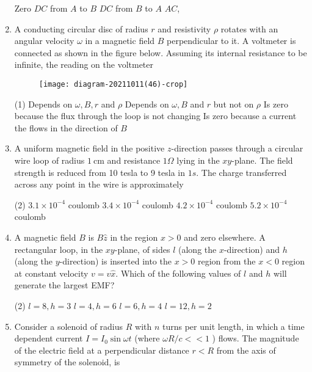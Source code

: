 \begin{enumerate}
\begin{tasks}
		\task[\textbf{A.}] Zero
		\task[\textbf{B.}] $D C$ from $A$ to $B$
		\task[\textbf{C.}] $D C$ from $B$ to $A$
		\task[\textbf{D.}] $A C$,
	\end{tasks}
	\item  A conducting circular disc of radius $r$ and resistivity $\rho$ rotates with an angular velocity $\omega$ in a magnetic field $B$ perpendicular to it. A voltmeter is connected as shown in the figure below. Assuming its internal resistance to be infinite, the reading on the voltmeter
	{}
	\begin{figure}[H]
		\centering
		\texttt{[image: diagram-20211011(46)-crop]}
	\end{figure}
	\begin{tasks}(1)
		\task[\textbf{A.}] Depends on $\omega, B, r$ and $\rho$
		\task[\textbf{B.}] Depends on $\omega, B$ and $r$ but not on $\rho$
		\task[\textbf{C.}]  Is zero because the flux through the loop is not changing
		\task[\textbf{D.}] Is zero because a current the flows in the direction of $B$
	\end{tasks}	
	\item A uniform magnetic field in the positive $z$-direction passes through a circular wire loop of radius $1 \mathrm{~cm}$ and resistance $1 \Omega$ lying in the $x y$-plane. The field strength is reduced from 10 tesla to 9 tesla in $1 s$. The charge transferred across any point in the wire is approximately
	{}
	\begin{tasks}(2)
		\task[\textbf{a.}] $3.1 \times 10^{-4}$ coulomb
		\task[\textbf{b.}]$3.4 \times 10^{-4}$ coulomb
		\task[\textbf{c.}]$4.2 \times 10^{-4}$ coulomb
		\task[\textbf{d.}] $5.2 \times 10^{-4}$ coulomb
	\end{tasks}	
	\item A magnetic field $B$ is $B \hat{z}$ in the region $x>0$ and zero elsewhere. A rectangular loop, in the $x y$-plane, of sides $l$ (along the $x$-direction) and $h$ (along the $y$-direction) is inserted into the $x>0$ region from the $x<0$ region at constant velocity $v=v \hat{x}$. Which of the following values of $l$ and $h$ will generate the largest EMF?
	{}
	\begin{tasks}(2)
		\task[\textbf{a.}] $l=8, h=3$
		\task[\textbf{b.}]$l=4, h=6$
		\task[\textbf{c.}]$l=6, h=4$
		\task[\textbf{d.}]  $l=12, h=2$
	\end{tasks}	
	\item Consider a solenoid of radius $R$ with $n$ turns per unit length, in which a time dependent current $I=I_{0} \sin \omega t$ (where $\omega R / c<<1$ ) flows. The magnitude of the electric field at a perpendicular distance $r<R$ from the axis of symmetry of the solenoid, is

\end{enumerate}
